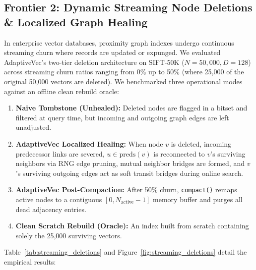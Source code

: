 \documentclass[conference,10pt]{IEEEtran}
\begin{document}
\subsection{Frontier 2: Dynamic Streaming Node Deletions \& Localized Graph Healing}
In enterprise vector databases, proximity graph indexes undergo continuous streaming churn where records are updated or expunged. We evaluated AdaptiveVec's two-tier deletion architecture on SIFT-50K ($N=50{,}000, D=128$) across streaming churn ratios ranging from 0\% up to 50\% (where 25,000 of the original 50,000 vectors are deleted). We benchmarked three operational modes against an offline clean rebuild oracle:
\begin{enumerate}
    \item \textbf{Naive Tombstone (Unhealed):} Deleted nodes are flagged in a bitset and filtered at query time, but incoming and outgoing graph edges are left unadjusted.
    \item \textbf{AdaptiveVec Localized Healing:} When node $v$ is deleted, incoming predecessor links are severed, $u \in \text{preds}(v)$ is reconnected to $v$'s surviving neighbors via RNG edge pruning, mutual neighbor bridges are formed, and $v$'s surviving outgoing edges act as soft transit bridges during online search.
    \item \textbf{AdaptiveVec Post-Compaction:} After 50\% churn, \texttt{compact()} remaps active nodes to a contiguous $[0, N_{\text{active}}-1]$ memory buffer and purges all dead adjacency entries.
    \item \textbf{Clean Scratch Rebuild (Oracle):} An index built from scratch containing solely the 25,000 surviving vectors.
\end{enumerate}

Table~\ref{tab:streaming_deletions} and Figure~\ref{fig:streaming_deletions} detail the empirical results:
\end{document}
